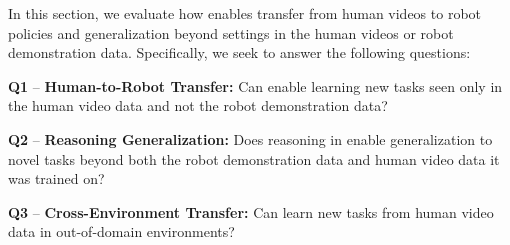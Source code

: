 


In this section, we evaluate how \ACRO enables transfer from human videos to robot policies and generalization beyond settings in the human videos or robot demonstration data. Specifically, we seek to answer the following questions:

\smallskip \noindent\textbf{Q1} -- \textbf{Human-to-Robot Transfer:} Can \ACRO enable learning new tasks seen only in the human video data and not the robot demonstration data?




\noindent\textbf{Q2} -- \textbf{Reasoning Generalization:} Does reasoning in \ACRO enable generalization to novel tasks beyond both the robot demonstration data and human video data it was trained on?

\noindent\textbf{Q3} -- \textbf{Cross-Environment Transfer:} Can \ACRO learn new tasks from human video data in out-of-domain environments?

